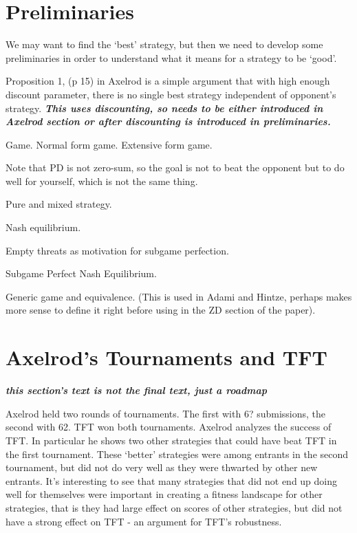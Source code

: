 \chapter{Preliminaries}

We may want to find the `best' strategy, but then we need to develop some preliminaries in order to understand what it means for a strategy to be `good'.

Proposition 1, (p 15) in Axelrod is a simple argument that with high enough discount parameter, there is no single best strategy independent of opponent's strategy. \textit{\textbf{This uses discounting, so needs to be either introduced in Axelrod section or after discounting is introduced in preliminaries.}}


\begin{definition}Game. Normal form game. Extensive form game.
\end{definition}

Note that PD is not zero-sum, so the goal is not to beat the opponent but to do well for yourself, which is not the same thing.

\begin{definition}Pure and mixed strategy.
\end{definition}

\begin{definition}Nash equilibrium.
\end{definition}

Empty threats as motivation for subgame perfection.

\begin{definition}Subgame Perfect Nash Equilibrium.
\end{definition}


\begin{definition}
Generic game and equivalence. (This is used in Adami and Hintze, perhaps makes more sense to define it right before using in the ZD section of the paper).
\end{definition}

\chapter{Axelrod's Tournaments and TFT}

\textit{\textbf{this section's text is not the final text, just a roadmap}}

Axelrod held two rounds of tournaments. The first with 6? submissions, the second with 62. TFT won both tournaments. Axelrod analyzes the success of TFT. In particular he shows two other strategies that could have beat TFT in the first tournament. These `better' strategies were among entrants in the second tournament, but did not do very well as they were thwarted by other new entrants. It's interesting to see that many strategies that did not end up doing well for themselves were important in creating a fitness landscape for other strategies, that is they had large effect on scores of other strategies, but did not have a strong effect on TFT - an argument for TFT's robustness.

